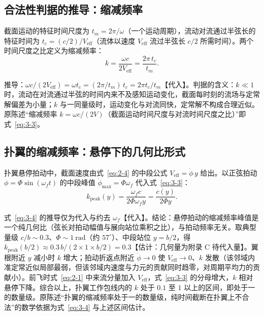 \documentclass[11pt,a4paper]{ctexart}
\numberwithin{equation}{section}
\begin{document}
\subsection{合法性判据的推导：缩减频率}

截面运动的特征时间尺度为 $t_m = 2\pi/\omega$（一个运动周期），流动对流通过半弦长的特征时间为 $t_c = (c/2)/V_{\text{eff}}$（流体以速度 $V_{\text{eff}}$ 流过半弦长 $c/2$ 所需时间）。两个时间尺度之比定义为缩减频率：
\begin{equation}
  k = \frac{\omega c}{2V_{\text{eff}}} = \frac{2\pi\, t_c}{t_m}. \label{eq:3-3}
\end{equation}

推导：$\omega c/(2V_{\text{eff}}) = \omega t_c = (2\pi/t_m)\, t_c = 2\pi t_c/t_m$【代入】。判据的含义：$k \ll 1$ 时，流动在对流通过半弦的时间内来不及感知运动变化，截面每时刻的流场与定常解偏差为小量；$k$ 与一同量级时，运动变化与对流同快，定常解不构成合理近似。原陈述“缩减频率 $k = \omega c/(2V)$（截面运动时间尺度与对流时间尺度之比）”即式~\eqref{eq:3-3}。

\subsection{扑翼的缩减频率：悬停下的几何比形式}

扑翼悬停拍动中，截面速度由式~\eqref{eq:2-4} 的中段公式 $V_{\text{eff}} = \dot{\phi}\,y$ 给出。以正弦拍动 $\phi = \Phi\sin(\omega_f t)$ 的中段峰值 $\dot{\phi}_{\max} = \Phi\omega_f$ 代入式~\eqref{eq:3-3}：
\begin{equation}
  k_{\text{peak}}(y) = \frac{\omega_f c}{2\Phi\omega_f y} = \frac{c(y)}{2\Phi y}. \label{eq:3-4}
\end{equation}

式~\eqref{eq:3-4} 的推导仅为代入与约去 $\omega_f$【代入】。结论：悬停拍动的缩减频率峰值是一个纯几何比（弦长对拍动幅值与展向站位乘积之比），与拍动频率无关。取典型量级 $c/b \sim 0.3$、$\Phi \sim 1\ \mathrm{rad}$（约 $57^\circ$）、中段站位 $y = b/2$，得 $k_{\text{peak}}(b/2) \approx 0.3\, b/(2 \times 1 \times b/2) = 0.3$【估计：几何量为附录 C 待代入量】。翼根附近 $y$ 减小时 $k$ 增大；拍动折返点附近 $\dot{\phi} \to 0$ 使 $V_{\text{eff}} \to 0$、$k$ 发散（该邻域内准定常近似局部最弱，但该邻域内速度与力元的贡献同时趋零，对周期平均力的贡献小）。前飞时式~\eqref{eq:2-1} 中来流分量加入 $V_{\text{eff}}$，式~\eqref{eq:3-3} 的分母增大，$k$ 相对悬停下降。综合以上，扑翼工作包线内的 $k$ 处于 $0.1$ 至 $1$ 以上的区间，即处于一的数量级。原陈述“扑翼的缩减频率处于一的数量级，纯时间截断在扑翼上不合法”的数学依据为式~\eqref{eq:3-4} 与上述区间估计。
\end{document}

